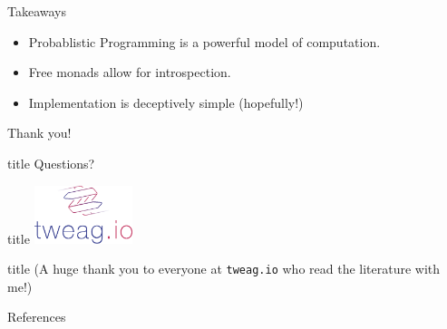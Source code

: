 \documentclass{beamer}
\begin{document}
\begin{frame}[fragile]{Takeaways}
    \begin{itemize}
        \item Probablistic Programming is a powerful model of computation.
        \item Free monads allow for introspection.
        \item Implementation is deceptively simple (hopefully!)
    \end{itemize}
\end{frame}

\begin{frame}[fragile]{Thank you!}
  \begin{beamercolorbox}[center]{title}
    Questions?
  \end{beamercolorbox}





  \vfill
  \begin{beamercolorbox}[center]{title}
        \includegraphics[height=64px]{res/tweag-io.pdf}
  \end{beamercolorbox}

  \begin{beamercolorbox}[center]{title}
    (A huge thank you to everyone at \texttt{tweag.io} who read the literature with me!)
  \end{beamercolorbox}
\end{frame}


\begin{frame}[allowframebreaks]{References}
        
        \nocite{*}
        
\end{frame}
\end{document}
